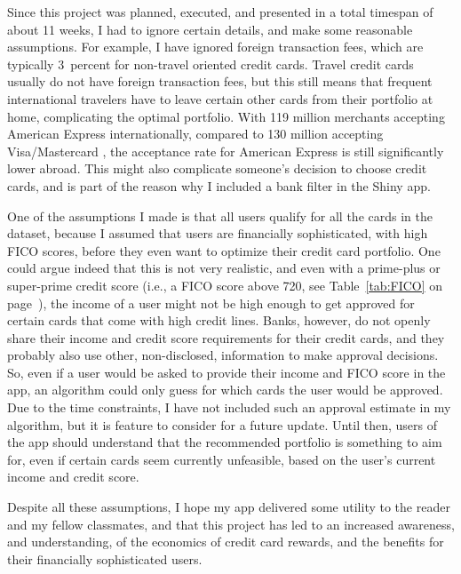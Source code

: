Since this project was planned, executed, and presented in a total timespan of about 11 weeks, I had to ignore certain details, and make some reasonable assumptions. 
For example, I have ignored foreign transaction fees, which are typically 3~percent for non-travel oriented credit cards. 
Travel credit cards usually do not have foreign transaction fees, but this still means that frequent international travelers have to leave certain other cards from their portfolio at home, complicating the optimal portfolio.
With 119 million merchants accepting American Express internationally, compared to 130 million accepting Visa/Mastercard \citep{thriftytraveler:2024}, the acceptance rate for American Express is still significantly lower abroad. 
This might also complicate someone's decision to choose credit cards, and is part of the reason why I included a bank filter in the \textsf{Shiny} app. 

One of the assumptions I made is that all users qualify for all the cards in the dataset, because I assumed that users are financially sophisticated, with high FICO scores, before they even want to optimize their credit card portfolio.  
One could argue indeed that this is not very realistic, and even with a prime-plus or super-prime credit score (i.e., a FICO score above 720, see Table~\ref{tab:FICO} on page~\pageref{tab:FICO}), the income of a user might not be high enough to get approved for certain cards that come with high credit lines. 
Banks, however, do not openly share their income and credit score requirements for their credit cards, and they probably also use other, non-disclosed, information to make approval decisions. 
So, even if a user would be asked to provide their income and FICO score in the app, 
an algorithm could only guess for which cards the user would be approved. 
Due to the time constraints, I have not included such an approval estimate in my algorithm, but it is feature to consider for a future update.
Until then, users of the app should understand that the recommended portfolio is something to aim for, even if certain cards seem currently unfeasible, based on the user's current income and credit score. 

Despite all these assumptions, I hope my app delivered some utility to the reader and my fellow classmates, and that this project has led to an increased awareness, and understanding, of the economics of credit card rewards, and the benefits for their financially sophisticated users. 
